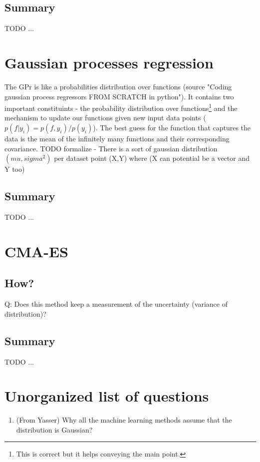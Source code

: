 \documentclass[12pt]{article}
\begin{document}
\subsection{Summary}
TODO ...

\section{Gaussian processes regression}

The GPr is like a probabilities distribution over functions (source "Coding gaussian process regressors FROM SCRATCH in python").
It contains two important constituints - the probability distribution over functions\footnote{This is correct but it helps conveying the main point.} and the mechanism to update our functions given new input data points ($p(f|y_i) = p(f, y_i) / p(y_i)$).
The best guess for the function that captures the data is the mean of the infinitely many functions and their corresponding covariance.
TODO formalize - There is a sort of gaussian distribution $(mu, sigma^2)$ per dataset point (X,Y) where (X can potential be a vector and Y too)


\subsection{Summary}
TODO ...

\section{CMA-ES}

\subsection{How?}
Q: Does this method keep a measurement of the uncertainty (variance of distribution)?


\subsection{Summary}
TODO ...

\section{Unorganized list of questions}
\begin{enumerate}
    \item (From Yasser) Why all the machine learning methods assume that the distribution is Gaussian? 
\end{enumerate}
\end{document}

